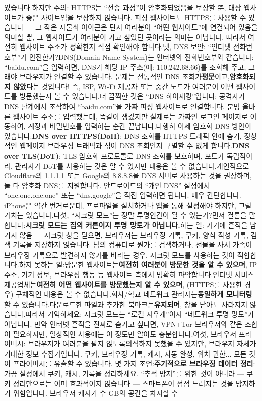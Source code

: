 있습니다.하지만 주의: HTTPS는 “전송 과정”이 암호화되었음을 보장할 뿐, 대상 웹사이트가 좋은 사이트임을 보장하지 않습니다. 피싱 웹사이트도 HTTPS를 사용할 수 있습니다 — 그 작은 자물쇠 아이콘은 단지 여러분이 “어떤 웹사이트”에 연결되어 있음을 의미할 뿐, 그 웹사이트가 여러분이 가고 싶었던 곳이라는 의미는 아닙니다. 따라서 여전히 웹사이트 주소가 정확한지 직접 확인해야 합니다.넷, DNS 보안: “인터넷 전화번호부”가 안전한가?DNS(Domain Name System)는 인터넷의 전화번호부와 같습니다: “baidu.com”을 입력하면, DNS가 해당 IP 주소(예: 110.242.68.66)를 조회해 주고, 그래야 브라우저가 연결할 수 있습니다. 문제는 전통적인 DNS 조회가\textbf{평문}이고,\textbf{암호화되지 않았다}는 것입니다! 즉, ISP, Wi-Fi 제공자 또는 중간 노드가 여러분이 어떤 웹사이트를 방문했는지 볼 수 있습니다.더 끔찍한 것은 “DNS 하이재킹”입니다: 공격자가 DNS 단계에서 조작하여 “baidu.com”을 가짜 피싱 웹사이트로 연결합니다. 분명 올바른 웹사이트 주소를 입력했는데, 똑같이 생겼지만 실제로는 가짜인 로그인 페이지로 이동하여, 계정과 비밀번호를 입력하는 순간 끝납니다.다행히 이제 암호화 DNS 방안이 있습니다:\textbf{DNS over HTTPS(DoH)}: DNS 조회를 HTTPS 트래픽 안에 숨겨, 정상적인 웹페이지 브라우징 트래픽과 섞어 DNS 조회인지 구별할 수 없게 합니다.\textbf{DNS over TLS(DoT)}: TLS 암호화 프로토콜로 DNS 조회를 보호하며, 포트가 독립적이라, 관리자가 DoT를 사용하는 것은 알 수 있지만 내용은 볼 수 없습니다.개인적으로 Cloudflare의 1.1.1.1 또는 Google의 8.8.8.8을 DNS 서버로 사용하는 것을 권장하며, 둘 다 암호화 DNS를 지원합니다. 안드로이드의 “개인 DNS” 설정에서 “one.one.one.one” 또는 “dns.google”을 직접 입력하면 됩니다. 매우 간단합니다. iPhone은 약간 번거로운데, 프로파일을 설치하거나 앱을 통해 설정해야 하지만, 그럴 가치는 있습니다.다섯, “시크릿 모드”는 정말 투명인간이 될 수 있는가?먼저 결론을 말합니다:\textbf{시크릿 모드는 집의 커튼이지 투명 망토가 아닙니다.}하는 일: 기기에 흔적을 남기지 않음 — 시크릿 창을 닫으면, 브라우저는 브라우징 기록, 쿠키, 양식 작성 기록, 검색 기록을 저장하지 않습니다. 남의 컴퓨터로 뭔가를 검색하거나, 선물을 사서 가족이 브라우징 기록으로 발견하지 않기를 바라는 경우, 시크릿 모드를 사용하는 것이 적합합니다.하지 못하는 일:방문한 웹사이트는\textbf{여전히 여러분이 방문한 것을 알 수 있으며}, IP 주소, 기기 정보, 브라우징 행동 등 웹사이트 측에서 명확히 파악합니다.인터넷 서비스 제공업체는\textbf{여전히 어떤 웹사이트를 방문했는지 알 수 있으며}, (HTTPS를 사용한 경우) 구체적인 내용은 볼 수 없습니다.회사/학교 네트워크 관리자는\textbf{동일하게 모니터링}할 수 있습니다.다운로드한 파일과 추가한 북마크는\textbf{유지되며}, 창을 닫아도 사라지지 않습니다.따라서 기억하세요: 시크릿 모드는 “로컬 지우개”이지 “네트워크 투명 망토”가 아닙니다. 만약 인터넷 흔적을 진짜로 숨기고 싶다면, VPN+Tor 브라우저와 같은 조합이 필요하지만, 일상적인 사용에는 이 정도만 알아도 충분합니다.여섯, 브라우저 프라이버시: 브라우저가 여러분을 팔지 않도록의식하지 못했을 수 있지만, 브라우저 자체가 거대한 정보 수집기입니다. 쿠키, 브라우징 기록, 캐시, 자동 완성, 위치 권한... 모든 것이 프라이버시를 유출할 수 있습니다. 몇 가지 조언:\textbf{주기적으로 브라우징 데이터 정리}: 가끔 설정에서 쿠키, 캐시, 기록을 정리하세요. “추적 방지”를 위한 것이 아니라 — 쿠키 정리만으로는 이미 효과적이지 않습니다 — 스마트폰이 점점 느려지는 것을 방지하기 위함입니다. 브라우저 캐시가 수 GB의 공간을 차지할 수 